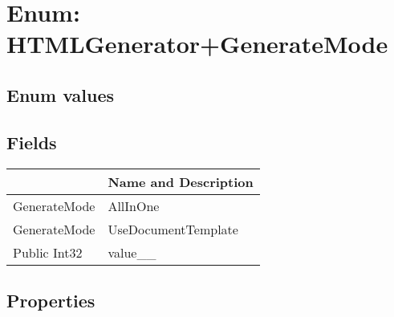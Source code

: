 \documentclass[11pt, oneside, a4paper]{book}
\begin{document}
\hypertarget{SoftwareEngineeringTools.{}Documentation.{}HTMLGenerator+GenerateMode}{}
\section{Enum: HTMLGenerator+GenerateMode}

\subsection{Enum values}

\subsection{Fields}
\begin{center}
\begin{tabular}{| p{3cm} | p{12cm} | }
\hline
\textbf{ } & \textbf{ Name and Description}\\
\hline
 GenerateMode &  AllInOne\hypertarget{SoftwareEngineeringTools.{}Documentation.{}HTMLGenerator+GenerateMode.{}AllInOne}{}\\
\hline
 GenerateMode &  UseDocumentTemplate\hypertarget{SoftwareEngineeringTools.{}Documentation.{}HTMLGenerator+GenerateMode.{}UseDocumentTemplate}{}\\
\hline
 Public  Int32 &  value\_\_\hypertarget{SoftwareEngineeringTools.{}Documentation.{}HTMLGenerator+GenerateMode.{}value\_\_}{}\\
\hline
\end{tabular}
\end{center}

\subsection{Properties}
\end{document}
